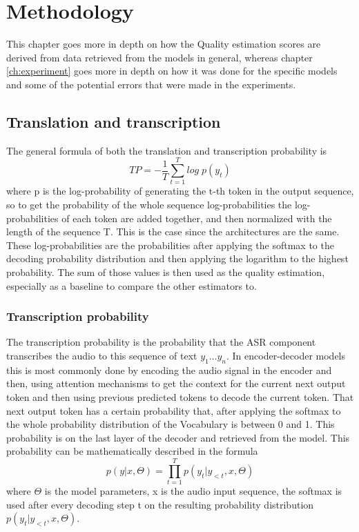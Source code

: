 
\chapter{Methodology}
\label{ch:methods}
This chapter goes more in depth on how the Quality estimation scores are derived from data retrieved from the models in general, whereas chapter \autoref{ch:experiment} goes more in depth on how it was done for the specific models and some of the potential errors that were made in the experiments.

\section{Translation and transcription}
The general formula of both the translation and transcription probability is $$TP=-\frac{1}{T}\sum_{t=1}^T log\; p(y_t) \label{formula:translation Probability}$$
where p is the log-probability of generating the t-th token in the output sequence, so to get the probability of the whole sequence log-probabilities the log-probabilities of each token are added together, and then normalized with the length of the sequence T. 
This is the case since the architectures are the same.
These log-probabilities are the probabilities after applying the softmax to the decoding probability distribution and then applying the logarithm to the highest probability.
The sum of those values is then used as the quality estimation, especially as a baseline to compare the other estimators to.


\subsection{Transcription probability}
The transcription probability is the probability that the ASR component transcribes the audio to this sequence of text $y_1\dots y_n$. 
In encoder-decoder models this is most commonly done by encoding the audio signal in the encoder and then, using attention mechanisms to get the context for the current next output token and then using previous predicted tokens to decode the current token. 
That next output token has a certain probability that, after applying the softmax to the whole probability distribution of the Vocabulary is between 0 and 1. This probability is on the last layer of the decoder and retrieved from the model. 
This probability can be mathematically described in the formula $$p(y|x,\Theta)=\prod_{t=1}^T p(y_t|y_{<t}, x, \Theta) $$ where $\Theta$ is the model parameters, x is the audio input sequence, the softmax is used after every decoding step t on the resulting probability distribution $p(y_t|y_{<t}, x,\Theta)$. 

